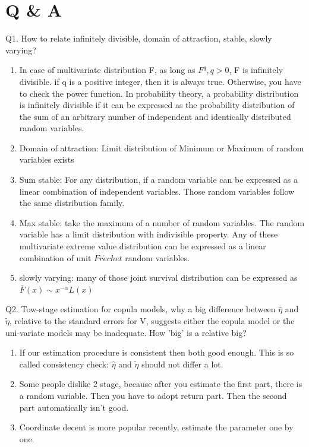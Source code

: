 \documentclass[a4paper,12pt]{texMemo}
\begin{document}
\maketitle %
\section{Q \& A}
Q1. How to relate infinitely divisible, domain of attraction, stable, slowly varying?
\begin{enumerate}
\item In case of multivariate distribution F, as long as $F^q, q>0$, F is infinitely divisible. if q is a positive integer, then it is always true. Otherwise, you have to check the power function.
In probability theory, a probability distribution is infinitely divisible if it can be expressed as the probability distribution of the sum of an arbitrary number of independent and identically distributed random variables. 
\item Domain of attraction: Limit distribution of Minimum or Maximum of random variables exists
\item Sum stable: For any distribution, if a random variable can be expressed as a linear combination of independent variables. Those random variables follow the same distribution family.
\item Max stable: take the maximum of a number of random variables. The random variable has a limit distribution with indivisible property. Any of these multivariate extreme value distribution can be expressed as a linear combination of unit $Fr\acute{e}chet$ random variables.
\item slowly varying: many of those joint survival distribution can be expressed as $\bar{F}(x) \sim x^{-\alpha} L(x)$
\end{enumerate}

Q2. Tow-stage estimation for copula models, why a big difference between $\hat{\eta}$ and $\tilde{\eta}$, relative to the standard errors for V, suggests either the copula model or the uni-variate models may be inadequate. How 'big' is a relative big?
\begin{enumerate}
\item If our estimation procedure is consistent then both good enough. This is so called consistency check: $\hat{\eta}$ and $\tilde{\eta}$ should not differ a lot.
\item Some people dislike 2 stage, because after you estimate the first part, there is a random variable. Then you have to adopt return part. Then the second part automatically isn't good.
\item Coordinate decent is more popular recently, estimate the parameter one by one. 
%
%
\end{enumerate}
\end{document}
